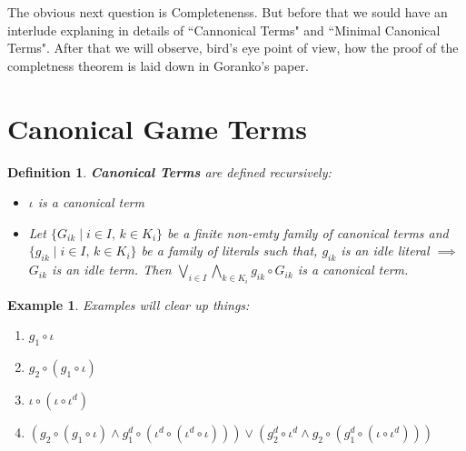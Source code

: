 \documentclass[10pt]{article}
\newcommand{\id}{\iota}
\newcommand{\com}[2]{#1 \circ #2 }
\newtheorem{definition}[theorem]{Definition}
\newtheorem{example}[theorem]{Example}
\begin{document}
	The obvious next question is Completenenss. But before that we sould have an interlude explaning in details of ``Cannonical Terms" and ``Minimal Canonical Terms". After that we will observe, bird's eye point of view, how the proof of the completness theorem is laid down in Goranko's paper.
	
	\section{Canonical Game Terms}
	\begin{definition}\textbf{Canonical Terms} are defined recursively:
		\begin{itemize}
			\item $\iota$ is a canonical term
			\item Let $\{G_{ik} \mid i\in I\text{, } k\in K_i\}$ be a finite non-emty family of canonical terms and $\{g_{ik}\mid i\in I\text{, } k\in K_i\}$ be a family of literals such that, $g_{ik}$ is an idle literal $\implies$ $G_{ik}$ is an idle term. Then $\bigvee_{i\in I} \bigwedge_{k \in K_i} g_{ik}\circ G_{ik}$ is a canonical term.
		\end{itemize}
	\end{definition}
	
	\begin{example}
		Examples will clear up things:
		\begin{enumerate}
			\item $g_1 \circ \iota$
			\item $g_2 \circ (g_1 \circ \iota)$
			\item $\iota \circ (\iota \circ \iota^d)$
			\item $(\com{g_2}{(\com{g_1}{\id})}\land \com{g_1^d}{(\com{\id^d}{(\com{\id^d}{\id})})}) \lor (g_2^d \circ \id^d \land g_2\circ (g_1^d \circ (\iota \circ \iota^d)))$
		\end{enumerate}
	\end{example}
	
\end{document}
